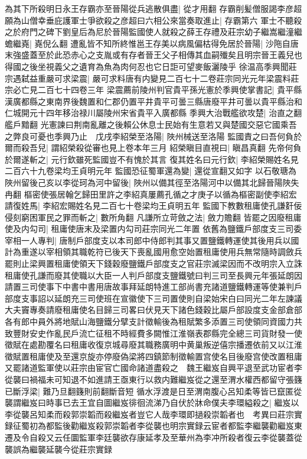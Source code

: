 為其下所殺明日永王存霸亦至晉陽從兵逃散俱盡|{
	從才用翻}
存霸削髪僧服謁李彦超願為山僧幸垂庇護軍士爭欲殺之彦超曰六相公來當奏取進止|{
	存霸第六}
軍士不聽殺之於府門之碑下劉皇后為尼於晉陽監國使人就殺之薛王存禮及莊宗幼子繼嵩繼潼繼蟾繼嶤|{
	嶤倪么翻}
遭亂皆不知所終惟邕王存美以病風偏枯得免居於晉陽|{
	沙陁自唐末強盛蓋至於此恐赤心之支胤或有存者晉王父子相傳其血嗣殱矣且明宗晉王義兒也得國之後坐視義父之遺育為魚為肉何忍也它日詎可望麥飯灑陵乎}
徐温高季興聞莊宗遇弑益重嚴可求梁震|{
	嚴可求料唐有内變見二百七十二卷莊宗同光元年梁震料莊宗必亡見二百七十四卷三年}
梁震薦前陵州判官貴平孫光憲於季興使掌書記|{
	貴平縣漢廣都縣之東南界後魏置和仁郡仍置平井貴平可曇三縣唐廢平井可曇以貴平縣治和仁城開元十四年移治禄川屬陵州宋省貴平入廣都縣}
季興大治戰艦欲攻楚|{
	治直之翻艦戶黯翻}
光憲諫曰荆南亂離之後賴公休息士民始有生意若又與楚國交惡它國乘吾之弊良可憂也季興乃止　戊戌李紹榮至洛陽|{
	陜州械送至洛陽}
監國責之曰吾何負於爾而殺吾兒|{
	謂紹榮殺從審也見上卷本年三月}
紹榮瞋目直視曰|{
	瞋昌真翻}
先帝何負於爾遂斬之|{
	元行欽雖死監國豈不有愧於其言}
復其姓名曰元行欽|{
	李紹榮賜姓名見二百六十九卷梁均王貞明元年}
監國恐征蜀軍還為變|{
	還從宣翻又如字}
以石敬瑭為陜州留後己亥以李從珂為河中留後|{
	陜州以備其徑至洛陽河中以備其北歸晉陽陜失冉翻}
樞密使張居翰乞歸田里許之李紹真屢薦孔循之才庚子以循為樞密副使李紹宏請復姓馬|{
	李紹宏賜姓名見二百七十卷梁均王貞明五年}
監國下教數租庸使孔謙姧佞侵刻窮困軍民之罪而斬之|{
	數所角翻}
凡謙所立苛斂之法|{
	斂力贍翻}
皆罷之因廢租庸使及内勾司|{
	租庸使唐末及梁置内勾司莊宗同光二年置}
依舊為鹽鐵戶部度支三司委宰相一人專判|{
	唐制戶部度支以本司郎中侍郎判其事又置鹽鐵轉運使其後用兵以國計為重遂以宰相領其職乾符已後天下喪亂國用愈空始置租庸使用兵無常隨時調斂兵罷則止梁興置租庸使領天下錢穀廢鹽鐵戶部度支之官莊宗滅梁因而不改明宗入立誅租庸使孔謙而廢其使職以大臣一人判戶部度支鹽鐵號曰判三司至長興元年張延朗因請置三司使事下中書中書用唐故事拜延朗特進工部尚書充諸道鹽鐵轉運等使兼判戶部度支事詔以延朗充三司使班在宣徽使下三司置使則自梁始宋白曰同光二年左諫議大夫竇專奏請廢租庸使名目歸三司畧曰伏見天下諸色錢穀比屬戶部設度支金部倉部各有郎中員外將地賦山海鹽鐵分擘支計徵輸後為租賦繁多添置三司使領同資國力共致豐財安史作亂民戶流亡征租不時經費多闕惟江淮嶺表郡縣完全總三司貨財發一使徵賦在處勘覆名曰租庸收復京城尋廢其職務廣明中黄巢叛逆僖宗播遷依前又以江淮徵賦置租庸使及至還京旋亦停廢偽梁將四鎮節制徵輸置宫使名目後廢宫使改置租庸}
又罷諸道監軍使以莊宗由宦官亡國命諸道盡殺之　魏王繼岌自興平退至武功宦者李從襲曰禍福未可知退不如進請王亟東行以救内難繼岌從之還至渭水權西都留守張籛已斷浮梁|{
	難乃旦翻籛則前翻斷音短}
循水浮渡是日至渭南腹心呂知柔等皆已竄匿從襲謂繼岌曰時事已去王宜自圖繼岌徘徊流涕乃自伏於牀命僕夫李環縊殺之|{
	繼岌以李從襲呂知柔而殺郭崇韜而殺繼岌者豈它人哉李環即撾殺崇韜者也　考異曰莊宗實録征蜀初為都監後勸繼岌殺郭崇韜者李從襲也明宗實録云宦者都監李繼襲勸繼岌東遷及令自殺又云任圜監軍李廷襲欲存康延孝及至華州為李冲所殺者復云李從襲蓋從襲誤為繼襲延襲今從莊宗實録}
